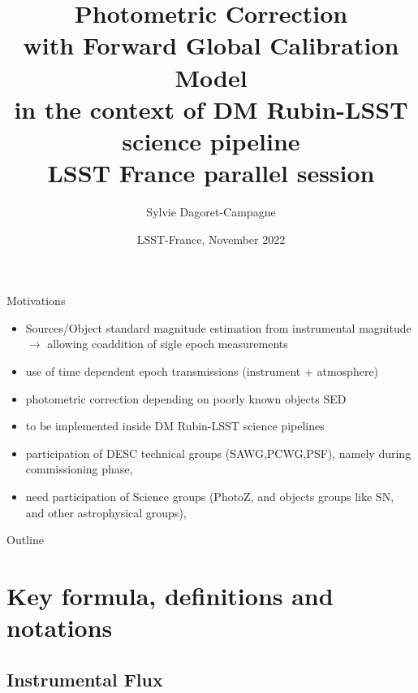 \documentclass{beamer}
\title[Photometric Corrections with FGCM]{Photometric Correction \\
with Forward Global Calibration Model \\
in the context of DM Rubin-LSST science pipeline \\
{\small LSST France parallel session}}
\author[S. Dagoret-Campagne]{
Sylvie Dagoret-Campagne}
\institute[IJCLab]{
  IJCLab,
  CNRS/IN2P3 \& Université Paris-Saclay,
  Orsay, France \\ \today  }
\date[LPNHE, November 29th 2022]{LSST-France, November 2022}
\begin{document}
\begin{frame}
  \titlepage
\end{frame}

\begin{frame}{Motivations}
\begin{itemize}
\item Sources/Object standard magnitude estimation from instrumental magnitude $\rightarrow$ allowing coaddition of sigle epoch measurements
\item use of time dependent epoch transmissions (instrument + atmosphere)
\item photometric correction depending on poorly known objects SED
\item to be implemented inside DM Rubin-LSST science pipelines 
\item participation of DESC technical groups (SAWG,PCWG,PSF), namely during commissioning phase,
\item need participation of Science groups (PhotoZ, and objects groups like SN, and other astrophysical groups),
\end{itemize}
\end{frame}

\begin{frame}{Outline}
  \tableofcontents
\end{frame}




\section{Key formula, definitions and notations}
\subsection{Instrumental Flux}
\end{document}
